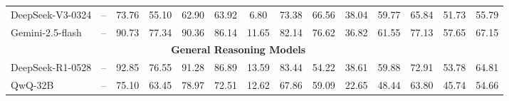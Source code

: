 \documentclass[letterpaper]{article} %
\begin{document}
\begin{table}[!t]
\begin{adjustbox}{max width=1.0\textwidth}
\begin{tabular}{llcccccccccccc}
DeepSeek-V3-0324                                    & \multicolumn{1}{c}{--}                             & 73.76                             & 55.10                             & 62.90                             & 63.92                                & 6.80                             & 73.38                             & 66.56                             & 38.04                             & 59.77                             & 65.84                             & 51.73                                & 55.79                                \\
Gemini-2.5-flash                                    & \multicolumn{1}{c}{--}                             & 90.73                             & 77.34                             & 90.36                             & 86.14                                & 11.65                            & 82.14                             & 76.62                             & 36.82                             & 61.55                             & 77.13                             & 57.65                                & 67.15                                \\ \midrule
\multicolumn{13}{c}{\textbf{General Reasoning Models}}                                                                                                                                                                                                                                                                                                                                                                                                                                                                    &                                      \\ \midrule
DeepSeek-R1-0528                                    & \multicolumn{1}{c}{--}                             & 92.85                             & 76.55                             & 91.28                             & 86.89                                & 13.59                            & 83.44                             & 54.22                             & 38.61                             & 59.88                             & 72.91                             & 53.78                                & 64.81                                \\
QwQ-32B                                             & \multicolumn{1}{c}{--}                             & 75.10                             & 63.45                             & 78.97                             & 72.51                                & 12.62                            & 67.86                             & 59.09                             & 22.65                             & 48.44                             & 63.80                             & 45.74                                & 54.66                                \\

\end{tabular}
\end{adjustbox}
\end{table}
\end{document}
